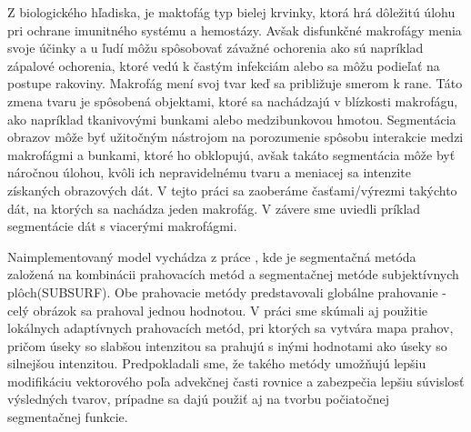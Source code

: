 \documentclass[a4paper,11pt,oneside]{article}%
\begin{document}
Z biologického hľadiska, je maktofág typ bielej krvinky, ktorá hrá dôležitú úlohu pri ochrane imunitného systému a hemostázy. Avšak disfunkčné makrofágy menia svoje účinky a u ľudí môžu spôsobovať závažné ochorenia ako sú napríklad  zápalové ochorenia, ktoré vedú k častým infekciám alebo sa môžu podieľať na postupe rakoviny. Makrofág mení svoj tvar keď sa približuje smerom k rane. Táto zmena tvaru je spôsobená objektami, ktoré sa nachádzajú v blízkosti makrofágu, ako napríklad tkanivovými bunkami alebo medzibunkovou hmotou.
Segmentácia obrazov môže byť užitočným nástrojom na porozumenie spôsobu interakcie medzi makrofágmi a bunkami, ktoré ho obklopujú, avšak takáto segmentácia môže byť náročnou úlohou, kvôli ich nepravidelnému tvaru a meniacej sa intenzite získaných obrazových dát. V tejto práci sa zaoberáme časťami/výrezmi takýchto dát, na ktorých sa nachádza jeden makrofág. V závere sme uviedli príklad 
segmentácie dát s  viacerými makrofágmi.



Naimplementovaný model vychádza z práce \cite{sora}, kde je segmentačná metóda založená na kombinácii prahovacích metód a segmentačnej metóde subjektívnych plôch(SUBSURF). Obe prahovacie metódy predstavovali globálne prahovanie - celý obrázok sa prahoval jednou hodnotou. V práci sme  skúmali aj použitie lokálnych adaptívnych prahovacích metód, pri ktorých sa vytvára mapa prahov, pričom úseky so slabšou intenzitou sa prahujú s inými hodnotami ako úseky so silnejšou intenzitou. Predpokladali sme, že takého metódy umožňujú lepšiu modifikáciu vektorového poľa advekčnej časti rovnice a zabezpečia lepšiu súvislosť výsledných tvarov, prípadne sa dajú použiť aj na tvorbu počiatočnej segmentačnej funkcie.
\end{document}
